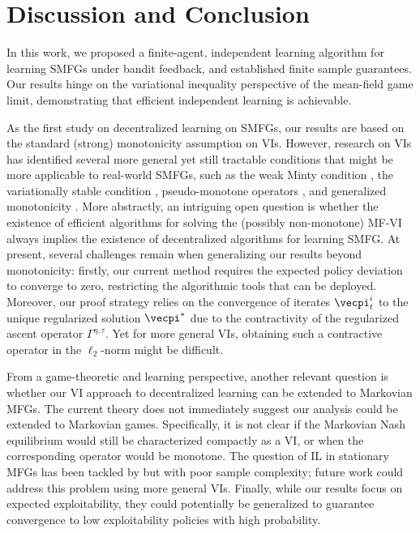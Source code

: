 

\section{Discussion and Conclusion}

In this work, we proposed a finite-agent, independent learning algorithm for learning SMFGs under bandit feedback, and established finite sample guarantees. Our results hinge on the variational inequality perspective of the mean-field game limit,  demonstrating that efficient independent learning is achievable. 

As the first study on decentralized learning on SMFGs, our results are based on the standard (strong) monotonicity assumption on VIs.
However, research on VIs has identified several more general yet still tractable conditions that might be more applicable to real-world SMFGs, such as  the weak Minty condition \citep{diakonikolas2021efficient}, the variationally stable condition \citep{mertikopoulos2019learning}, pseudo-monotone operators \citep{karamardian1976complementarity}, and generalized monotonicity \citep{kotsalis2022simple}.
More abstractly, an intriguing open question is whether the existence of efficient algorithms for solving the (possibly non-monotone) MF-VI always implies the existence of decentralized algorithms for learning SMFG.
At present, several challenges remain when generalizing our results beyond monotonicity: firstly, our current method requires the expected policy deviation to converge to zero, restricting the algorithmic tools that can be deployed.
Moreover, our proof strategy relies on the convergence of iterates $\vecpi_t^i$ to the unique regularized solution $\vecpi^*$ due to the contractivity of the regularized ascent operator $\Gamma^{\eta,\tau}$. Yet for more general VIs, obtaining such a contractive operator in the $\ell_2$-norm might be difficult.


From a game-theoretic and learning perspective, another relevant question is whether our VI approach to decentralized learning can be extended to Markovian MFGs. 
The current theory does not immediately suggest our analysis could be extended to Markovian games.
Specifically, it is not clear if the Markovian Nash equilibrium would still be characterized compactly as a VI,  or when the corresponding operator would be monotone.
The question of IL in stationary MFGs has been tackled by \cite{yardim2023policy} but with poor sample complexity; future work could address this problem using more general VIs.
Finally, while our results focus on expected exploitability, they could potentially be generalized to guarantee convergence to low exploitability policies with high probability.
